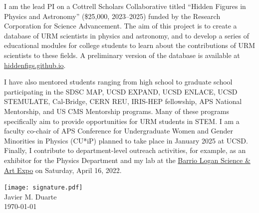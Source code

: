 \documentclass[11pt,letterpaper,notitlepage]{article}
\begin{document}
I am the lead PI on a Cottrell Scholars Collaborative titled ``Hidden Figures in Physics and Astronomy'' (\$25,000, 2023--2025) funded by the Research Corporation for Science Advancement.
The aim of this project is to create a database of URM scientists in physics and astronomy, and to develop a series of educational modules for college students to learn about the contributions of URM scientists to these fields.
A preliminary version of the database is available at\\\href{https://hiddenfigs.github.io}{hiddenfigs.github.io}.

I have also mentored students ranging from high school to graduate school participating in the SDSC MAP, UCSD EXPAND, UCSD ENLACE, UCSD STEMULATE, Cal-Bridge, CERN REU, IRIS-HEP fellowship, APS National Mentorship, and US CMS Mentorship programs.
Many of these programs specifically aim to provide opportunities for URM students in STEM.
I am a faculty co-chair of APS Conference for Undergraduate Women and Gender Minorities in Physics (CU*iP) planned to take place in January 2025 at UCSD.
Finally, I contribute to department-level outreach activities, for example, as an exhibitor for the Physics Department and my lab at the \href{https://www.barriologansae.com/}{Barrio Logan Science \& Art Expo} on Saturday, April 16, 2022.

\vspace{0.1in}
\texttt{[image: signature.pdf]}\\
\indent\indent Javier M. Duarte\\
\indent\indent \today
\end{document}
